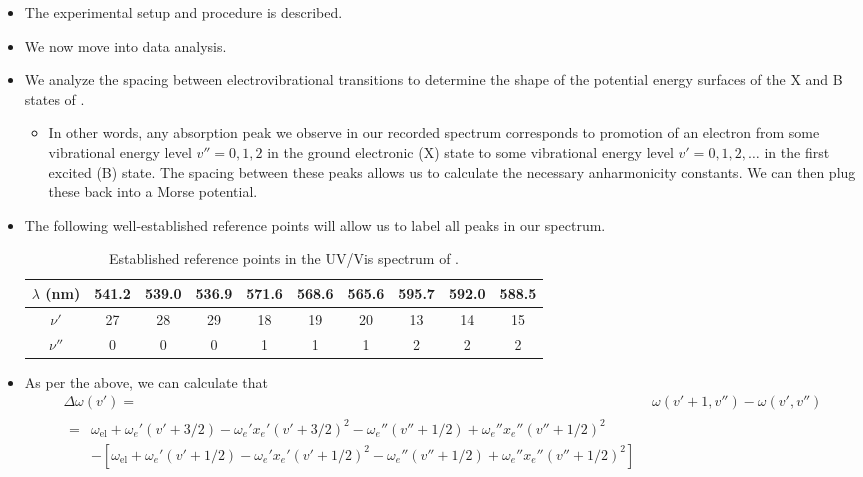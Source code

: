 \documentclass[../notes.tex]{subfiles}
\begin{document}
\begin{itemize}
    \item The experimental setup and procedure is described.
    \item We now move into data analysis.
    \item We analyze the spacing between electrovibrational transitions to determine the shape of the potential energy surfaces of the X and B states of .
    \begin{itemize}
        \item In other words, any absorption peak we observe in our recorded spectrum corresponds to promotion of an electron from some vibrational energy level $v''=0,1,2$ in the ground electronic (X) state to some vibrational energy level $v'=0,1,2,\dots$ in the first excited (B) state. The spacing between these peaks allows us to calculate the necessary anharmonicity constants. We can then plug these back into a Morse potential.
    \end{itemize}
    \item The following well-established reference points will allow us to label all peaks in our spectrum.
    \begin{table}[h!]
        \centering
        \small
        \renewcommand{\arraystretch}{1.2}
        \begin{tabular}{|c|c|c|c|c|c|c|c|c|c|}
            \hline
            $\lambda$ (\si{\nano\meter}) & 541.2 & 539.0 & 536.9 & 571.6 & 568.6 & 565.6 & 595.7 & 592.0 & 588.5\\
            \hline
            $\nu'$ & 27 & 28 & 29 & 18 & 19 & 20 & 13 & 14 & 15\\
            \hline
            $\nu''$ & 0 & 0 & 0 & 1 & 1 & 1 & 2 & 2 & 2\\
            \hline
        \end{tabular}
        \caption{Established reference points in the UV/Vis spectrum of .}
        \label{tab:UVVisI2References}
    \end{table}
    \item As per the above, we can calculate that
    \begin{align*}
        \Delta\omega(v') ={}& \omega(v'+1,v'')-\omega(v',v'')\\
        \begin{split}
            ={}& \omega_\text{el}+\omega_e'(v'+3/2)-\omega_e'x_e'(v'+3/2)^2-\omega_e''(v''+1/2)+\omega_e''x_e''(v''+1/2)^2\\
            &-\left[ \omega_\text{el}+\omega_e'(v'+1/2)-\omega_e'x_e'(v'+1/2)^2-\omega_e''(v''+1/2)+\omega_e''x_e''(v''+1/2)^2 \right]

\end{split}
\end{align*}
\end{itemize}
\end{document}
